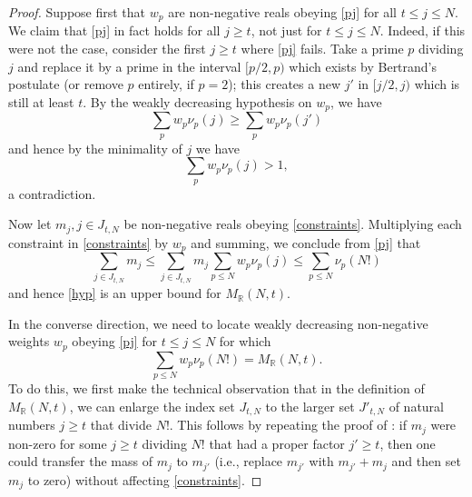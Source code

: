 \documentclass[12pt,a4paper,reqno]{amsart}
\numberwithin{equation}{section}
\theoremstyle{plain}
\theoremstyle{definition}
\newcommand\R{\mathbb{R}}
\begin{document}
\begin{proof}  Suppose first that $w_p$ are non-negative reals obeying \eqref{pj} for all $t \leq j \leq N$.
We claim that \eqref{pj} in fact holds for all $j \geq t$, not just for $t \leq j \leq N$.  Indeed, if this were not the case, consider the first $j \geq t$ where \eqref{pj} fails.  Take a prime $p$ dividing $j$ and replace it by a prime in the interval $[p/2,p)$ which exists by Bertrand's postulate (or remove $p$ entirely, if $p=2$); this creates a new $j'$ in $[j/2,j)$ which is still at least $t$.  By the weakly decreasing hypothesis on $w_p$, we have
  $$ \sum_p w_p \nu_p(j) \geq \sum_p w_p \nu_p(j')$$
  and hence by the minimality of $j$ we have
  $$ \sum_p w_p \nu_p(j) > 1,$$
  a contradiction.

Now let $m_j, j \in J_{t,N}$ be non-negative reals obeying \eqref{constraints}.  Multiplying each constraint in \eqref{constraints} by $w_p$ and summing, we conclude from \eqref{pj} that
$$ \sum_{j \in J_{t,N}} m_j  \leq \sum_{j \in J_{t,N}} m_j \sum_{p \leq N} w_p \nu_p(j) \leq \sum_{p \leq N} \nu_p(N!)$$
and hence \eqref{hyp} is an upper bound for $M_\R(N,t)$.

In the converse direction, we need to locate weakly decreasing non-negative weights $w_p$ obeying \eqref{pj} for $t \leq j \leq N$ for which
\begin{equation}\label{wpm} 
  \sum_{p \leq N} w_p \nu_p(N!) = M_\R(N,t).
\end{equation}
To do this, we first make the technical observation that in the definition of $M_\R(N,t)$, we can enlarge the index set $J_{t,N}$ to the larger set $J'_{t,N}$ of natural numbers $j \geq t$ that divide $N!$.  This follows by repeating the proof of : if $m_j$ were non-zero for some $j \geq t$ dividing $N!$ that had a proper factor $j' \geq t$, then one could transfer the mass of $m_j$ to $m_{j'}$ (i.e., replace $m_{j'}$ with $m_{j'}+m_j$ and then set $m_j$ to zero) without affecting \eqref{constraints}.  


\end{proof}
\end{document}
